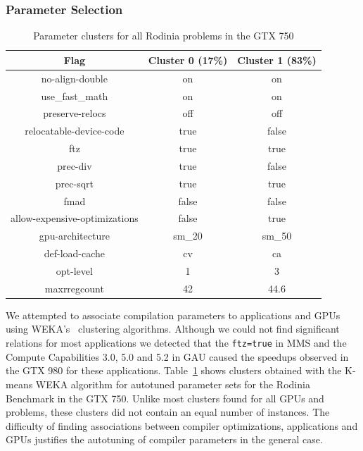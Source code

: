 \subsubsection{Parameter Selection}

\begin{table}[htpb]
    \centering
    \footnotesize
    \begin{tabular}{ccc}
        \toprule
        \textbf{Flag} & \textbf{Cluster 0 (17\%)} & \textbf{Cluster 1 (83\%)} \\\midrule
        no-align-double               & on     & on     \\\midrule
        use\_fast\_math               & on     & on     \\\midrule
        preserve-relocs               & off    & off    \\\midrule
        relocatable-device-code       & true   & false  \\\midrule
        ftz                           & true   & true   \\\midrule
        prec-div                      & true   & false  \\\midrule
        prec-sqrt                     & true   & true   \\\midrule
        fmad                          & false  & false  \\\midrule
        allow-expensive-optimizations & false  & true   \\\midrule
        gpu-architecture              & sm\_20 & sm\_50 \\\midrule
        def-load-cache                & cv     & ca     \\\midrule
        opt-level                     & 1      & 3      \\\midrule
        maxrregcount                  & 42     & 44.6   \\\bottomrule
        \end{tabular}
    \caption{Parameter clusters for all Rodinia problems in the GTX 750}
    \label{tab:750RodiniaClusters}
\end{table}

We attempted to associate compilation parameters to applications and GPUs using
WEKA's~\cite{holmes1994weka} clustering algorithms. Although we could not find
significant relations for most applications we detected that the
\texttt{ftz=true} in MMS and the Compute Capabilities 3.0, 5.0 and 5.2 in GAU
caused the speedups observed in the GTX 980 for these applications.
Table~\ref{tab:750RodiniaClusters} shows clusters obtained with the K-means
WEKA algorithm for autotuned parameter sets for the Rodinia Benchmark in the
GTX 750. Unlike most clusters found for all GPUs and problems, these clusters
did not contain an equal number of instances. The difficulty of finding
associations between compiler optimizations, applications and GPUs justifies
the autotuning of compiler parameters in the general case.


